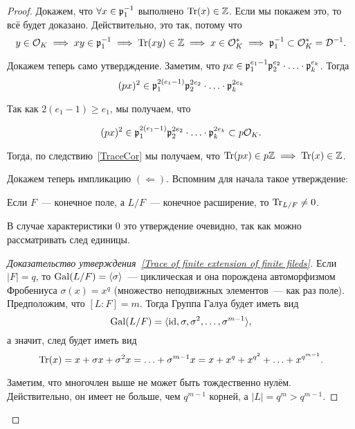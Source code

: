 \begin{proof}
	 	Докажем, что $\forall x \in \mathfrak{p}_{1}^{-1}$ выполнено $\operatorname{Tr}(x) \in \mathbb{Z}$. Если мы покажем это, то всё будет доказано. Действительно, это так, потому что 
	 	\[
	 		y \in \mathcal{O}_{K} \implies xy \in \mathfrak{p}_{1}^{-1} \implies \operatorname{Tr}(xy) \in \mathbb{Z} \implies x \in \mathcal{O}_{K}^{*} \implies \mathfrak{p}_{1}^{-1} \subset \mathcal{O}_{K}^{*} = \mathcal{D}^{-1}.    
	 	\]

	 	Докажем теперь само утвердждение. Заметим, что $px \in \mathfrak{p}_{1}^{e_1 - 1} \mathfrak{p}_{2}^{e_2} \cdot \ldots \cdot \mathfrak{p}_{k}^{e_k}$. Тогда 
	 	\[
	 		(px)^2 \in \mathfrak{p}_1^{2(e_1 - 1)} \mathfrak{p}_{2}^{2e_2} \cdot \ldots \cdot \mathfrak{p}_{k}^{2e_k}
	 	\]

	 	Так как $2(e_1 - 1) \ge e_1$, мы получаем, что 

	 	\[
	 		(px)^2 \in \mathfrak{p}_1^{2(e_1 - 1)} \mathfrak{p}_{2}^{2e_2} \cdot \ldots \cdot \mathfrak{p}_{k}^{2e_k} \subset p\mathcal{O}_{K}.
	 	\]

	 	Тогда, по следствию~\ref{TraceCor} мы получаем, что $\operatorname{Tr}(px) \in p\mathbb{Z} \implies \operatorname{Tr}(x) \in \mathbb{Z}$.

	 	Докажем теперь импликацию $(\mathbf{\Leftarrow})$. Вспомним для начала такое утверждение:

	 	\begin{statement}\label{Trace of finite extension of finite fileds} 
	 		Если $F$~--- конечное поле, а $L/F$~--- конечное расширение, то $\operatorname{Tr}_{L/F} \neq 0$.
	 	\end{statement}

	 	\begin{remark}
	 		В случае характеристики 0 это утверждение очевидно,  так как можно рассматривать след единицы. 
	 	\end{remark}

	 	\begin{proof}[Доказательство утверждения~\ref{Trace of finite extension of finite fileds}]
	 		Если $|F| = q$, то $\operatorname{Gal}(L/F) = \langle \sigma \rangle$~--- циклическая и она порождена автоморфизмом Фробениуса $\sigma(x) = x^q$ (множество неподвижных элементов~--- как раз поле). Предположим, что $[L \colon F] = m$. Тогда Группа Галуа будет иметь вид 
	 		\[
	 			\operatorname{Gal}(L/F) = \langle \operatorname{id}, \sigma, \sigma^2, \ldots, \sigma^{m - 1} \rangle,
	 		\]
	 		а значит, след будет иметь вид 
	 		\[
	 			\operatorname{Tr}(x) = x + \sigma x + \sigma^2 x = \ldots + \sigma^{m - 1}x = x + x^q + x^{q^2} + \ldots + x^{q^{m - 1}}.
	 		\]

	 		Заметим, что многочлен выше не может быть тождественно нулём. Действительно, он имеет не больше, чем $q^{m - 1}$ корней, а $|L| = q^m > q^{m - 1}$.
	 	\end{proof}


\end{proof}
